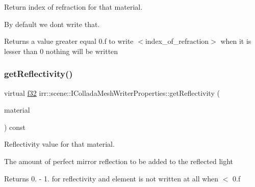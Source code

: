 Return index of refraction for that material. 

By default we don\textquotesingle{}t write that. \begin{DoxyReturn}{Returns}
a value greater equal 0.\+f to write $<$index\+\_\+of\+\_\+refraction$>$ when it is lesser than 0 nothing will be written 
\end{DoxyReturn}
\mbox{\label{classirr_1_1scene_1_1IColladaMeshWriterProperties_ad880b5fc91114049b20347a31199b2a9}} 
\subsubsection{\texorpdfstring{get\+Reflectivity()}{getReflectivity()}}
{\footnotesize\ttfamily virtual \hyperlink{namespaceirr_a0277be98d67dc26ff93b1a6a1d086b07}{f32} irr\+::scene\+::\+I\+Collada\+Mesh\+Writer\+Properties\+::get\+Reflectivity (\begin{DoxyParamCaption}\item[{const \hyperlink{classirr_1_1video_1_1SMaterial}{video\+::\+S\+Material} \&}]{material }\end{DoxyParamCaption}) const\hspace{0.3cm}{\ttfamily [pure virtual]}}



Reflectivity value for that material. 

The amount of perfect mirror reflection to be added to the reflected light \begin{DoxyReturn}{Returns}
0. -\/ 1. for reflectivity and element is not written at all when $<$ 0.\+f 
\end{DoxyReturn}
\mbox{\label{classirr_1_1scene_1_1IColladaMeshWriterProperties_a171287213537036be889a36ae4896c0e}} 
